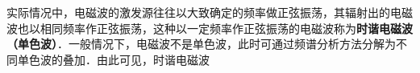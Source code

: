 
实际情况中，电磁波的激发源往往以大致确定的频率做正弦振荡，其辐射出的电磁波也以相同频率作正弦振荡，这种以一定频率作正弦振荡的电磁波称为\textbf{时谐电磁波（单色波）}．一般情况下，电磁波不是单色波，此时可通过频谱分析方法分解为不同单色波的叠加．由此可见，时谐电磁波